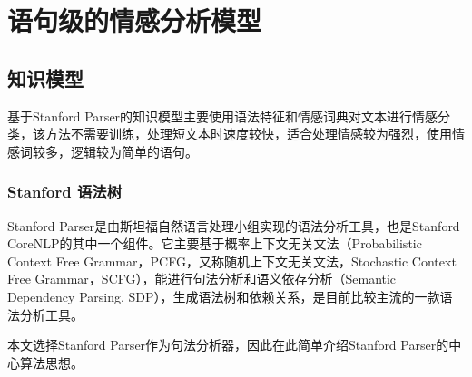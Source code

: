 \chapter{语句级的情感分析模型}
\section{知识模型}
基于Stanford Parser的知识模型主要使用语法特征和情感词典对文本进行情感分类，该方法不需要训练，处理短文本时速度较快，适合处理情感较为强烈，使用情感词较多，逻辑较为简单的语句。
\subsection{Stanford 语法树}
Stanford Parser是由斯坦福自然语言处理小组实现的语法分析工具，也是Stanford CoreNLP的其中一个组件。它主要基于概率上下文无关文法（Probabilistic Context Free Grammar，PCFG，又称随机上下文无关文法，Stochastic Context Free Grammar，SCFG），能进行句法分析和语义依存分析（Semantic Dependency Parsing, SDP），生成语法树和依赖关系，是目前比较主流的一款语法分析工具。\par
本文选择Stanford Parser作为句法分析器，因此在此简单介绍Stanford Parser的中心算法思想。\par

